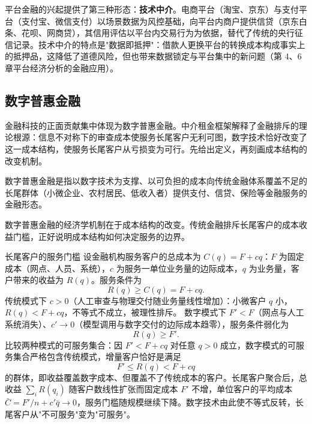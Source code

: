 平台金融的兴起提供了第三种形态：\textbf{技术中介}。电商平台（淘宝、京东）与支付平台（支付宝、微信支付）以场景数据为风控基础，向平台内商户提供信贷（京东白条、花呗、网商贷），其信用评估以平台内交易行为为依据，替代了传统的央行征信记录。技术中介的特点是"数据即抵押"：借款人更换平台的转换成本构成事实上的抵押品，这降低了道德风险，但也带来数据锁定与平台集中的新问题（第 4、6 章平台经济分析的金融应用）。

\subsection{数字普惠金融}

金融科技的正面贡献集中体现为数字普惠金融。中介租金框架解释了金融排斥的理论根源：信息不对称下的审查成本使服务长尾客户无利可图，数字技术恰好改变了这一成本结构，使服务长尾客户从亏损变为可行。先给出定义，再刻画成本结构的改变机制。

\begin{definition}
数字普惠金融是指以数字技术为支撑、以可负担的成本向传统金融体系覆盖不足的长尾群体（小微企业、农村居民、低收入者）提供支付、信贷、保险等金融服务的金融形态。
\end{definition}

数字普惠金融的经济学机制在于成本结构的改变。传统金融排斥长尾客户的成本收益门槛，正好说明成本结构如何决定服务的边界。

\begin{derivation}{长尾客户的服务门槛}{}
设金融机构服务客户的总成本为 $C(q) = F + cq$：$F$ 为固定成本（网点、人员、系统），$c$ 为服务一单位业务量的边际成本，$q$ 为业务量，客户带来的收益为 $R(q)$。服务条件为
\[
R(q) \ge C(q) = F + cq.
\]
传统模式下 $c > 0$（人工审查与物理交付随业务量线性增加）：小微客户 $q$ 小，$R(q) < F + cq$，不等式不成立，被理性排斥。
数字模式下 $F' < F$（网点与人工系统消失）、$c' \to 0$（模型调用与数字交付的边际成本趋零），服务条件弱化为
\[
R(q) \ge F'.
\]
比较两种模式的可服务集合：因 $F' < F + cq$ 对任意 $q > 0$ 成立，数字模式的可服务集合严格包含传统模式，增量客户恰好是满足
\[
F' \le R(q) < F + cq
\]
的群体，即收益覆盖数字成本、但覆盖不了传统成本的客户。长尾客户聚合后，总收益 $\sum_i R(q_i)$ 随客户数线性扩张而固定成本 $F'$ 不增，单位客户的平均成本 $\bar C = F'/n + c' \bar q \to 0$，服务门槛随规模继续下降。数字技术由此使不等式反转，长尾客户从"不可服务"变为"可服务"。
\end{derivation}

